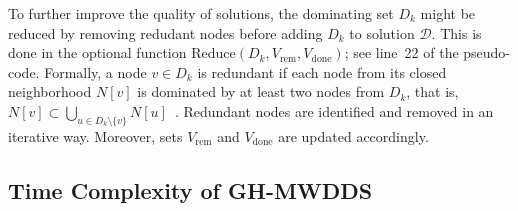 \documentclass[algorithms,article,accept,moreauthors,pdftex]{Definitions/mdpi}
\begin{document}

To further improve the quality of solutions, the dominating set $D_k$ might be reduced by removing redudant nodes before adding $D_k$ to solution $\mathcal{D}$. This is done in the optional function \textsf{Reduce}$(D_k, V_{\mathrm{rem}}, V_{\mathrm{done}})$; see line~22 of the pseudo-code. Formally, a node $v \in D_k$  is redundant if each node from its closed neighborhood $N[v]$ is dominated by at least two nodes from $D_k$, that is, $N[v] \subset \bigcup_{u \in D_k \setminus \{v\}} N[u]$~\cite{bouamama2016:hybrid}. Redundant nodes are identified and removed in an iterative way. Moreover, sets $V_{\mathrm{rem}}$ and $V_{\mathrm{done}}$ are updated accordingly.

\subsection{Time Complexity of GH-MWDDS}
\end{document}
